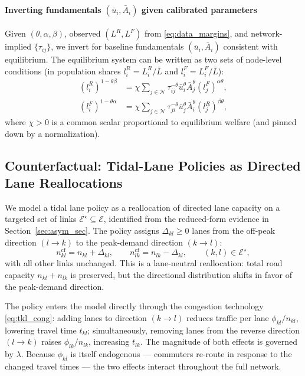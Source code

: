 \documentclass[12pt]{article}
\begin{document}
	\paragraph{Inverting fundamentals $(\bar u_i,\bar A_i)$ given calibrated parameters}
	Given $(\theta,\alpha,\beta)$, observed $(L^R,L^F)$ from \eqref{eq:data_margins}, and network-implied $\{\tau_{ij}\}$, we invert for baseline fundamentals $(\bar u_i,\bar A_i)$ consistent with equilibrium. The equilibrium system can be written as two sets of node-level conditions (in population shares $l_i^R=L_i^R/\bar L$ and $l_i^F=L_i^F/\bar L$):
	\begin{align}
		(l_i^R)^{1-\theta\beta} &= \chi \sum_{j\in\mathcal N}\tau_{ij}^{-\theta}\bar u_i^\theta \bar A_j^\theta (l_j^F)^{\alpha\theta},\label{eq:invert_R}\\
		(l_i^F)^{1-\theta\alpha} &= \chi \sum_{j\in\mathcal N}\tau_{ji}^{-\theta}\bar u_j^\theta \bar A_i^\theta (l_j^R)^{\beta\theta},\label{eq:invert_F}
	\end{align}
	where $\chi>0$ is a common scalar proportional to equilibrium welfare (and pinned down by a normalization). 
	
		\subsection{Counterfactual: Tidal-Lane Policies as Directed Lane Reallocations}

	We model a tidal lane policy as a reallocation of directed lane capacity on a targeted set of links $\mathcal{E}^\star\subseteq\mathcal{E}$, identified from the reduced-form evidence in Section~\ref{sec:asym_sec}. The policy assigns $\Delta_{kl}\geq 0$ lanes from the off-peak direction $(l\to k)$ to the peak-demand direction $(k\to l)$:
	\begin{equation}\label{eq:cf_lanes}
		n_{kl}^{\mathrm{cf}} = n_{kl} + \Delta_{kl},
		\qquad
		n_{lk}^{\mathrm{cf}} = n_{lk} - \Delta_{kl},
		\qquad (k,l)\in\mathcal{E}^\star,
	\end{equation}
	with all other links unchanged. This is a lane-neutral reallocation: total road capacity $n_{kl}+n_{lk}$ is preserved, but the directional distribution shifts in favor of the peak-demand direction.

	The policy enters the model directly through the congestion technology \eqref{eq:tkl_cong}: adding lanes to direction $(k\to l)$ reduces traffic per lane $\phi_{kl}/n_{kl}$, lowering travel time $t_{kl}$; simultaneously, removing lanes from the reverse direction $(l\to k)$ raises $\phi_{lk}/n_{lk}$, increasing $t_{lk}$. The magnitude of both effects is governed by $\lambda$. Because $\phi_{kl}$ is itself endogenous --- commuters re-route in response to the changed travel times --- the two effects interact throughout the full network.
\end{document}
